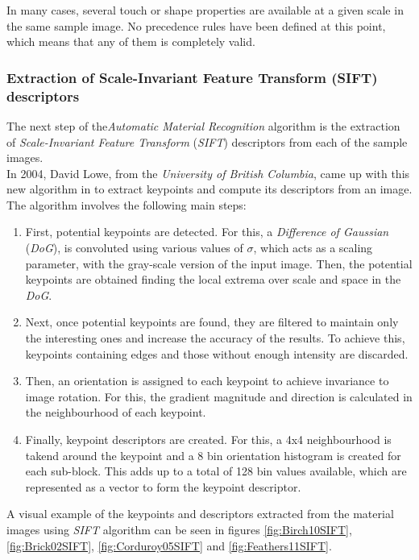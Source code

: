 In many cases, several touch or shape properties are available at a given scale in the same sample image. No precedence rules have been defined at this point, which means that any of them is completely valid. 


\subsubsection{Extraction of Scale-Invariant Feature Transform (SIFT) descriptors}

The next step of the\emph{Automatic Material Recognition} algorithm is the extraction of \emph{Scale-Invariant Feature Transform} (\emph{SIFT}) descriptors from each of the sample images. \\

In 2004, David Lowe, from the \emph{University of British Columbia}, came up with this new algorithm in \cite{Lowe_2004_SIFT} to extract keypoints and compute its descriptors from an image. The algorithm involves the following main steps:

\begin{enumerate}
    \item First, potential keypoints are detected. For this, a \emph{Difference of Gaussian} (\emph{DoG}), is convoluted using various values of $\sigma$, which acts as a scaling parameter, with the gray-scale version of the input image. Then, the potential keypoints are obtained finding the local extrema over scale and space in the \emph{DoG}.
    \item Next, once potential keypoints are found, they are filtered to maintain only the interesting ones and increase the accuracy of the results. To achieve this, keypoints containing edges and those without enough intensity are discarded.
    \item Then, an orientation is assigned to each keypoint to achieve invariance to image rotation. For this, the gradient magnitude and direction is calculated in the neighbourhood of each keypoint. 
    \item Finally, keypoint descriptors are created. For this, a 4x4 neighbourhood is takend around the keypoint and a 8 bin orientation histogram is created for each sub-block. This adds up to a total of 128 bin values available, which are represented as a vector to form the keypoint descriptor.
\end{enumerate}

A visual example of the keypoints and descriptors extracted from the material images using \emph{SIFT} algorithm can be seen in figures \ref{fig:Birch10SIFT}, \ref{fig:Brick02SIFT}, \ref{fig:Corduroy05SIFT} and \ref{fig:Feathers11SIFT}.

